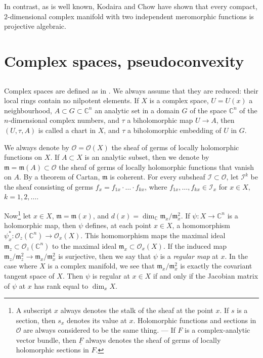 \documentclass{article}
\theoremstyle{plain}
\newcommand{\scr}[1]{{\mathscr{#1}}}
\newcommand{\CC}{\mathbb{C}}
\newcommand{\fk}{\mathfrak}
\begin{document}
In contrast, as is well known, Kodaira and Chow \cite{4} have shown that every compact, $2$-dimensional complex manifold with two independent meromorphic functions is projective algebraic.


\section{Complex spaces, pseudoconvexity}
\label{1}

\subsection{}
\label{1.1}

Complex spaces are defined as in \cite{10}.
We always assume that they are reduced: their local rings contain no nilpotent elements.
If $X$ is a complex space, $U=U(x)$ a neighbourhood, $A\subset G\subset \CC^n$ an analytic set in a domain $G$ of the space $\CC^n$ of the $n$-dimensional complex numbers, and $\tau$ a biholomorphic map $U\to A$, then $(U,\tau,A)$ is called a chart in $X$, and $\tau$ a biholomorphic embedding of $U$ in $G$.

We always denote by $\scr{O}=\scr{O}(X)$ the sheaf of germs of locally holomorphic functions on $X$.
If $A\subset X$ is an analytic subset, then we denote by $\fk{m}=\fk{m}(A)\subset\scr{O}$ the sheaf of germs of locally holomorphic functions that vanish on $A$.
By a theorem of Cartan, $\fk{m}$ is coherent.
For every subsheaf $\scr{I}\subset\scr{O}$, let $\scr{I}^k$ be the sheaf consisting of germs $f_x=f_{1x}\cdot\ldots\cdot f_{kx}$, where $f_{1x},\ldots,f_{kx}\in\scr{I}_x$ for $x\in X$, $k=1,2,\ldots$.

Now\footnote{
  A subscript $x$ always denotes the stalk of the sheaf at the point $x$.
  If $s$ is a section, then $s_x$ denotes its value at $x$.
  Holomorphic functions and sections in $\scr{O}$ are always considered to be the same thing.
  --- If $F$ is a complex-analytic vector bundle, then $\underline{F}$ always denotes the sheaf of germs of locally holomorphic sections in $F$.
}
let $x\in X$, $\fk{m}=\fk{m}(x)$, and $d(x)=\dim_\CC\fk{m}_x/\fk{m}_x^2$.
If $\psi\colon X\to\CC^n$ is a holomorphic map, then $\psi$ defines, at each point $x\in X$, a homomorphism $\psi_x^*\colon\scr{O}_z(\CC^n)\to\scr{O}_x(X)$.
This homomorphism maps the maximal ideal $\fk{m}_z\subset\scr{O}_z(\CC^n)$ to the maximal ideal $\fk{m}_x\subset\scr{O}_x(X)$.
If the induced map $\fk{m}_z/\fk{m}_z^2\to\fk{m}_x/\fk{m}_x^2$ is surjective, then we say that $\psi$ is a \emph{regular map} at $x$.
In the case where $X$ is a complex manifold, we see that $\fk{m}_x/\fk{m}_x^2$ is exactly the covariant tangent space of $X$.
Then $\psi$ is regular at $x\in X$ if and only if the Jacobian matrix of $\psi$ at $x$ has rank equal to $\dim_x X$.
\end{document}

